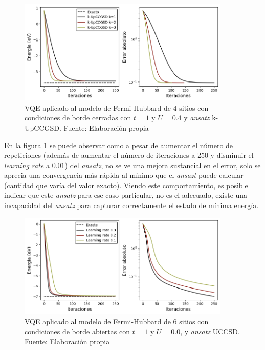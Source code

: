 \begin{figure}[H]
\centering
\includegraphics[width=0.9\textwidth]{figures/S4/fermi/barridofh2.png}
\caption{\label{fig:12} VQE aplicado al modelo de Fermi-Hubbard de 4 sitios con condiciones de borde cerradas con $t=1$ y $U=0.4$ y \textit{ansatz} k-UpCCGSD. Fuente: Elaboración propia}
\end{figure}

En la figura \ref{fig:12} se puede observar como a pesar de aumentar el número de repeticiones (además de aumentar el número de iteraciones a 250 y disminuir el \textit{learning rate} a $0.01$) del \textit{ansatz}, no se ve una mejora sustancial en el error, solo se aprecia una convergencia más rápida al mínimo que el \textit{ansazt} puede calcular (cantidad que varía del valor exacto). Viendo este comportamiento, es posible indicar que este \textit{ansatz} para ese caso particular, no es el adecuado, existe una incapacidad del \textit{ansatz} para capturar correctamente el estado de mínima energía.

\begin{figure}[H]
\centering
\includegraphics[width=0.9\textwidth]{figures/S4/fermi/barridofh3.png}
\caption{\label{fig:13} VQE aplicado al modelo de Fermi-Hubbard de 6 sitios con condiciones de borde abiertas con $t=1$ y $U=0.0$, y \textit{ansatz} UCCSD. Fuente: Elaboración propia}
\end{figure}

